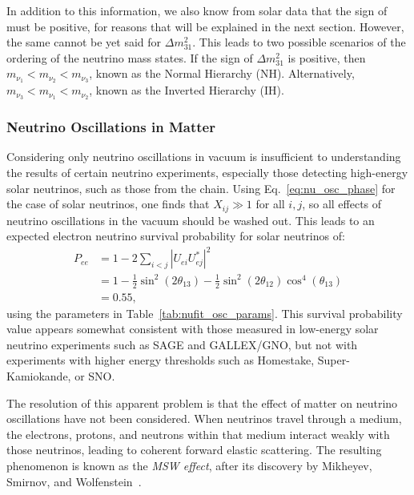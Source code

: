 In addition to this information, we also know from solar data that the sign of \dmsq{} must be positive, for reasons that will be explained in the next section. However, the same cannot be yet said for $\Delta m^{2}_{31}$. This leads to two possible scenarios of the ordering of the neutrino mass states. If the sign of $\Delta m^{2}_{31}$ is positive, then $m_{\nu_{1}}<m_{\nu_{2}}<m_{\nu_{3}}$, known as the Normal Hierarchy (NH). Alternatively, $m_{\nu_{3}}<m_{\nu_{1}}<m_{\nu_{2}}$, known as the Inverted Hierarchy (IH).

\subsubsection{Neutrino Oscillations in Matter}
Considering only neutrino oscillations in vacuum is insufficient to understanding the results of certain neutrino experiments, especially those detecting high-energy solar neutrinos, such as those from the \beight{} chain. Using Eq.~\ref{eq:nu_osc_phase} for the case of solar neutrinos, one finds that $X_{ij}\gg 1$ for all $i,j$, so all effects of neutrino oscillations in the vacuum should be washed out. This leads to an expected electron neutrino survival probability for solar neutrinos of:
\begin{align}\label{eq:solar_pee_naive}
    P_{ee}  &= 1 - 2\sum_{i<j}|U_{ei}U_{ej}^{*}|^{2}\\
            &= 1 - \frac{1}{2}\sin^{2}(2\theta_{13}) - \frac{1}{2}\sin^{2}(2\theta_{12})\cos^{4}(\theta_{13})\\
            &= 0.55,
\end{align}
using the parameters in Table~\ref{tab:nufit_osc_params}. This survival probability value appears somewhat consistent with those measured in low-energy solar neutrino experiments such as SAGE and GALLEX/GNO, but not with experiments with higher energy thresholds such as Homestake, Super-Kamiokande, or SNO.

The resolution of this apparent problem is that the effect of matter on neutrino oscillations have not been considered. When neutrinos travel through a medium, the electrons, protons, and neutrons within that medium interact weakly with those neutrinos, leading to coherent forward elastic scattering. The resulting phenomenon is known as the \textit{MSW effect}, after its discovery by Mikheyev, Smirnov, and Wolfenstein~\cite{wolfensteinNeutrinoOscillationsMatter1978,mikheyevResonantAmplificationOscillations1986}. %

